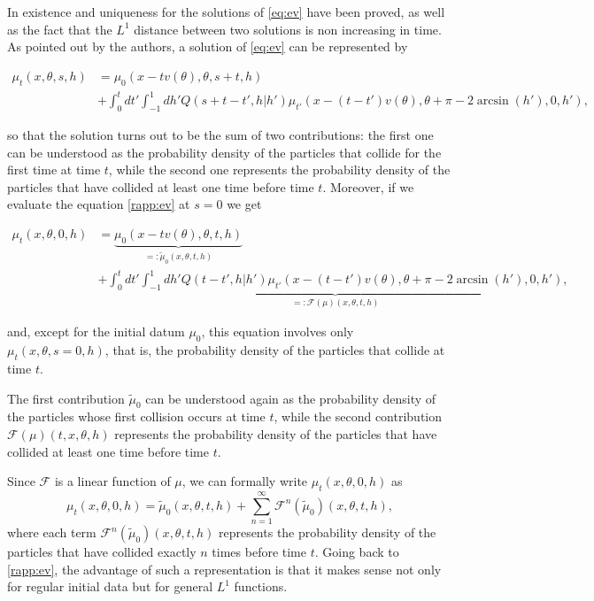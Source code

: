 \documentclass[a4paper,10pt,reqno]{amsart}
\numberwithin{equation}{subsection}
\numberwithin{figure}{subsection}
\begin{document}
In \cite{MS2008bgl} existence and uniqueness for the solutions of \eqref{eq:ev} have been proved, as well as the fact that the $L^1$ distance between two solutions is non increasing in time. As pointed out by the authors, a solution of \eqref{eq:ev} can be represented by

{\footnotesize\begin{align}
\nonumber\mu_t(x,\theta,s,h)&=\mu_0(x-tv(\theta),\theta,s+t,h)
\\
\label{rapp:ev}&+\int_0^tdt'\int_{-1}^1dh'Q(s+t-t',h|h')\mu_{t'}(x-(t-t')v(\theta),\theta+\pi-2\arcsin(h'),0,h'),
\end{align}}

so that the solution turns out to be the sum of two contributions: the first one can be understood as the probability density of the particles that collide for the first time at time $t$, while the second one represents the probability density of the particles that have collided at least one time before time $t$. Moreover, if we evaluate the equation \eqref{rapp:ev} at $s=0$ we get

{\small\begin{align*}
\mu_t(x,\theta,0,h)&=\underbrace{\mu_0(x-tv(\theta),\theta,t,h)}_{=:\tilde\mu_0(x,\theta,t,h)}
\\
&+\underbrace{\int_0^tdt'\int_{-1}^1dh'Q(t-t',h|h')\mu_{t'}(x-(t-t')v(\theta),\theta+\pi-2\arcsin(h'),0,h')}_{=:{\mathcal F}(\mu)(x,\theta,t,h)},
\end{align*}}

and, except for the initial datum $\mu_0$, this equation involves only $\mu_t(x,\theta,s=0,h)$, that is, the probability density of the particles that collide at time $t$.

The first contribution $\tilde\mu_0$ can be understood again as the probability density of the particles whose first collision occurs at time $t$, while the second contribution ${\mathcal F}(\mu)(t,x,\theta,h)$ represents the probability density of the particles that have collided at least one time before time $t$.

Since ${\mathcal F}$ is a linear function of $\mu$, we can formally write $\mu_t(x,\theta,0,h)$ as
\[
\mu_t(x,\theta,0,h)=\tilde\mu_0(x,\theta,t,h)+\sum_{n=1}^{\infty}{\mathcal F}^n(\tilde\mu_0)(x,\theta,t,h),
\]
where each term ${\mathcal F}^n(\tilde\mu_0)(x,\theta,t,h)$ represents the probability density of the particles that have collided exactly $n$ times before time $t$. Going back to \eqref{rapp:ev}, the advantage of such a representation is that it makes sense not only for regular initial data but for general $L^1$ functions.
\end{document}

